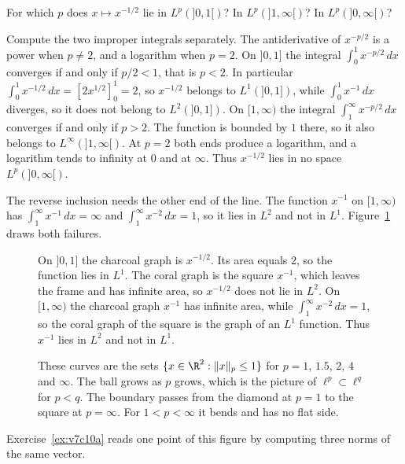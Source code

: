 \begin{think}
For which $p$ does $x\mapsto x^{-1/2}$ lie in $L^p(]0,1[)$? In $L^p(]1,\infty[)$? In $L^p(]0,\infty[)$?
\end{think}

Compute the two improper integrals separately. The antiderivative of $x^{-p/2}$ is a power when $p\ne2$, and a logarithm when $p=2$. On $]0,1]$ the integral $\int_0^1 x^{-p/2}\,dx$ converges if and only if $p/2<1$, that is $p<2$. In particular $\int_0^1 x^{-1/2}\,dx=[2x^{1/2}]_0^1=2$, so $x^{-1/2}$ belongs to $L^1(]0,1])$, while $\int_0^1 x^{-1}\,dx$ diverges, so it does not belong to $L^2(]0,1])$. On $[1,\infty)$ the integral $\int_1^\infty x^{-p/2}\,dx$ converges if and only if $p>2$. The function is bounded by $1$ there, so it also belongs to $L^\infty(]1,\infty[)$. At $p=2$ both ends produce a logarithm, and a logarithm tends to infinity at $0$ and at $\infty$. Thus $x^{-1/2}$ lies in no space $L^p(]0,\infty[)$.

The reverse inclusion needs the other end of the line. The function $x^{-1}$ on $[1,\infty)$ has $\int_1^\infty x^{-1}\,dx=\infty$ and $\int_1^\infty x^{-2}\,dx=1$, so it lies in $L^2$ and not in $L^1$. Figure~\ref{fig:rwsplit} draws both failures.

\begin{figure}[ht]
\centering
{}
\caption{On $]0,1]$ the charcoal graph is $x^{-1/2}$. Its area equals $2$, so the function lies in $L^1$. The coral graph is the square $x^{-1}$, which leaves the frame and has infinite area, so $x^{-1/2}$ does not lie in $L^2$. On $[1,\infty)$ the charcoal graph $x^{-1}$ has infinite area, while $\int_1^\infty x^{-2}\,dx=1$, so the coral graph of the square is the graph of an $L^1$ function. Thus $x^{-1}$ lies in $L^2$ and not in $L^1$.}
\label{fig:rwsplit}
\end{figure}

\begin{figure}[ht]
\centering
{}
\caption{These curves are the sets $\{x\in\R^2:\|x\|_p\le1\}$ for $p=1$, $1.5$, $2$, $4$ and $\infty$. The ball grows as $p$ grows, which is the picture of $\ell^p\subset\ell^q$ for $p<q$. The boundary passes from the diamond at $p=1$ to the square at $p=\infty$. For $1<p<\infty$ it bends and has no flat side.}
\label{fig:lpballs}
\end{figure}

Exercise~\ref{ex:v7c10a} reads one point of this figure by computing three norms of the same vector.

